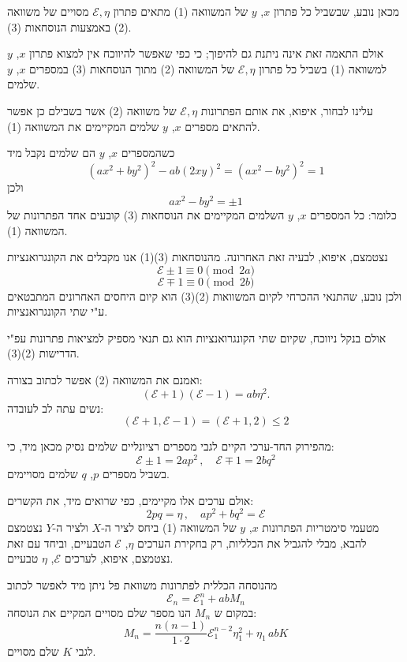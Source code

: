 \noindent מכאן נובע, שבשביל כל פתרון $x$, $y$ של המשוואה (1) מתאים פתרון $\mathcal{E}, \eta$ מסויים של משוואה (2) באמצעות הנוסחאות (3).

\noindent אולם התאמה זאת אינה ניתנת גם להיפוך; כי כפי שאפשר להיווכח אין למצוא פתרון $x$, $y$ למשוואה (1) בשביל כל פתרון $\mathcal{E}, \eta$ של המשוואה (2) מתוך הנוסחאות (3) במספרים $x$, $y$ שלמים.

\noindent עלינו לבחור, איפוא, את אותם הפתרונות $\mathcal{E}, \eta$ של משוואה (2) אשר בשבילם כן אפשר להתאים מספרים $x$, $y$ שלמים המקיימים את המשוואה (1).

\medskip
\noindent כשהמספרים $x$, $y$ הם שלמים נקבל מיד
\[ (ax^2 + by^2)^2 - ab(2xy)^2 = (ax^2 - by^2)^2 = 1 \]
ולכן
\[ ax^2 - by^2 = \pm 1 \]
כלומר: כל המספרים $x$, $y$ השלמים המקיימים את הנוסחאות (3) קובעים אחד הפתרונות של המשוואה (1).

\medskip
\noindent נצטמצם, איפוא, לבעיה זאת האחרונה. מהנוסחאות (3)(1) אנו מקבלים את הקונגרואנציות
\[ \mathcal{E} \pm 1 \equiv 0 \pmod{2a} \tag{4} \]
\[ \mathcal{E} \mp 1 \equiv 0 \pmod{2b} \]
ולכן נובע, שהתנאי ההכרחי לקיום המשוואות (2)(3) הוא קיום היחסים האחרונים המתבטאים ע"י שתי הקונגרואנציות.

\noindent אולם בנקל ניווכח, שקיום שתי הקונגרואנציות הוא גם תנאי מספיק למציאות פתרונות עפ"י הדרישות (2)(3).

\noindent ואמנם את המשוואה (2) אפשר לכתוב בצורה:
\[ (\mathcal{E} + 1)(\mathcal{E} - 1) = ab\eta^2 . \]
נשים עתה לב לעובדה:
\[ (\mathcal{E} + 1, \mathcal{E} - 1) = (\mathcal{E} + 1, 2) \leq 2 \]

\noindent מהפירוק החד-ערכי הקיים לגבי מספרים רציונליים שלמים נסיק מכאן מיד, כי:
\[ \mathcal{E} \pm 1 = 2ap^2 \, , \quad \mathcal{E} \mp 1 = 2bq^2 \]
בשביל מספרים $p$, $q$ שלמים מסויימים.

\noindent אולם ערכים אלו מקיימים, כפי שרואים מיד, את הקשרים:
\[ 2pq = \eta \, , \quad ap^2 + bq^2 = \mathcal{E} \]
מטעמי סימטריות הפתרונות $x$, $y$ של המשוואה (1) ביחס לציר ה-$X$ ולציר ה-$Y$ נצטמצם להבא, מבלי להגביל את הכלליות, רק בחקירת הערכים $\eta$, $\mathcal{E}$ הטבעיים, וביחד עם זאת נצטמצם, איפוא, לערכים $\mathcal{E}$, $\eta$ טבעיים.

\medskip
\noindent מהנוסחה הכללית לפתרונות משוואת פל ניתן מיד לאפשר לכתוב
\[ \mathcal{E}_n = \mathcal{E}_1^n + abM_n \tag{5} \]
במקום ש $M_n$ הנו מספר שלם מסויים המקיים את הנוסחה:
\[ M_n = \frac{n(n-1)}{1 \cdot 2}\mathcal{E}_1^{n-2}\eta_1^2 + \eta_1 \, abK \tag{6} \]
לגבי $K$ שלם מסויים.

